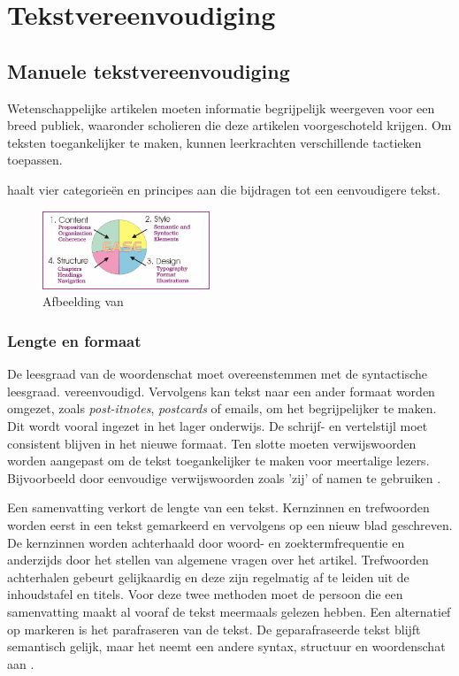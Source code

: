 \section{Tekstvereenvoudiging}


\subsection{Manuele tekstvereenvoudiging}

Wetenschappelijke artikelen moeten informatie begrijpelijk weergeven voor een breed publiek, waaronder scholieren die deze artikelen voorgeschoteld krijgen. Om teksten toegankelijker te maken, kunnen leerkrachten verschillende tactieken toepassen.

\textcite{Dubay2004} haalt vier categorieën en principes aan die bijdragen tot een eenvoudigere tekst.

\begin{figure}[H]
	\begin{center}
		\includegraphics[width=5cm]{img/text-simplification-reading-ease.png}
	\end{center}
	\caption{Afbeelding van \textcite{Dubay2004}}
\end{figure}


\subsubsection{Lengte en formaat}

De leesgraad van de woordenschat moet overeenstemmen met de syntactische leesgraad. vereenvoudigd. Vervolgens kan tekst naar een ander formaat worden omgezet, zoals \textit{post-itnotes}, \textit{postcards} of emails, om het begrijpelijker te maken. Dit wordt vooral ingezet in het lager onderwijs. De schrijf- en vertelstijl moet consistent blijven in het nieuwe formaat. Ten slotte moeten verwijswoorden worden aangepast om de tekst toegankelijker te maken voor meertalige lezers. Bijvoorbeeld door eenvoudige verwijswoorden zoals 'zij' of namen te gebruiken \autocite{Rijkhoff2022}. 

Een samenvatting verkort de lengte van een tekst. Kernzinnen en trefwoorden worden eerst in een tekst gemarkeerd en vervolgens op een nieuw blad geschreven. De kernzinnen worden achterhaald door woord- en zoektermfrequentie en anderzijds door het stellen van algemene vragen over het artikel. Trefwoorden achterhalen gebeurt gelijkaardig en deze zijn regelmatig af te leiden uit de inhoudstafel en titels. Voor deze twee methoden moet de persoon die een samenvatting maakt al vooraf de tekst meermaals gelezen hebben. Een alternatief op markeren is het parafraseren van de tekst. De geparafraseerde tekst blijft semantisch gelijk, maar het neemt een andere syntax, structuur en woordenschat aan \autocite{Rijkhoff2022}.

